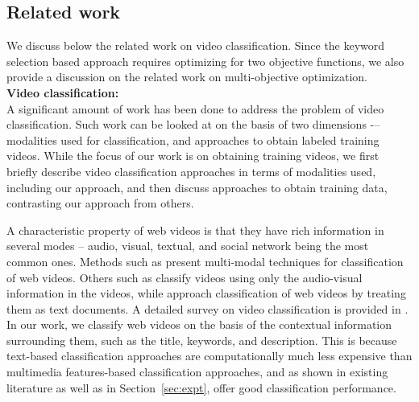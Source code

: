\subsection{Related work} 
\label{sec:relatedwork}
We discuss below the related work on video classification. Since the keyword selection based approach requires optimizing for two objective functions, we also provide a discussion on the related work on multi-objective optimization. \\

\noindent \textbf{Video classification: }\\ 
A significant amount of work has been done to address the problem of video classification. Such work can be looked at on the basis of two dimensions -– modalities used for classification, and approaches to obtain labeled training videos.  While the focus of our work is on obtaining training videos, we first briefly describe video classification approaches in terms of modalities used, including our approach, and then discuss approaches to obtain training data, contrasting our approach from others. 

A characteristic property of web videos is that they have rich information in several modes -- audio, visual, textual, and social network being the most common ones. Methods such as \cite{song2010taxonomic,wang2010youtubecat,zhang2011improving,ramachandran2009videomule,yang2007multi} present multi-modal techniques for classification of web videos. Others such as \cite{schindler2008internet,chen2010effective} classify videos using only the audio-visual information in the videos, while \cite{chen2010web,wu2010data} approach classification of web videos by treating them as text documents. A detailed survey on video classification is provided in \cite{brezeale2008automatic}. In our work, we classify web videos on the basis of the contextual information surrounding them, such as the title, keywords, and description. This is because text-based classification approaches are computationally much less expensive than multimedia features-based classification approaches, and as shown in existing literature as well as in Section~\ref{sec:expt}, offer good classification performance.  

